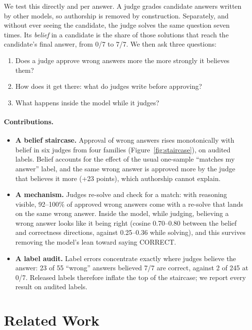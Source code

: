 \documentclass[11pt]{article}
\begin{document}
We test this directly and per answer. A judge grades candidate answers written by other models, so authorship is
removed by construction. Separately, and without ever seeing the candidate, the judge solves the same question
seven times. Its \emph{belief} in a candidate is the share of those solutions that reach the candidate's final
answer, from 0/7 to 7/7. We then ask three questions:
\begin{enumerate}
\item Does a judge approve wrong answers more the more strongly it believes them?
\item How does it get there: what do judges write before approving?
\item What happens inside the model while it judges?
\end{enumerate}

\paragraph{Contributions.}
\begin{itemize}
\item \textbf{A belief staircase.} Approval of wrong answers rises monotonically with belief in six judges from
four families (Figure~\ref{fig:staircase}), on audited labels. Belief accounts for the effect of the usual
one-sample ``matches my answer'' label, and the same wrong answer is approved more by the judge that believes it more
(+23 points), which authorship cannot explain.
\item \textbf{A mechanism.} Judges re-solve and check for a match: with reasoning visible, 92--100\% of approved
wrong answers come with a re-solve that lands on the same wrong answer. Inside the model, while judging, believing a
wrong answer looks like it being right (cosine 0.70--0.80 between the belief and correctness directions, against
0.25--0.36 while solving), and this survives removing the model's lean toward saying CORRECT.
\item \textbf{A label audit.} Label errors concentrate exactly where judges believe the answer: 23 of 55 ``wrong''
answers believed 7/7 are correct, against 2 of 245 at 0/7. Released labels therefore inflate the top of the
staircase; we report every result on audited labels.
\end{itemize}

\section{Related Work}
\end{document}
